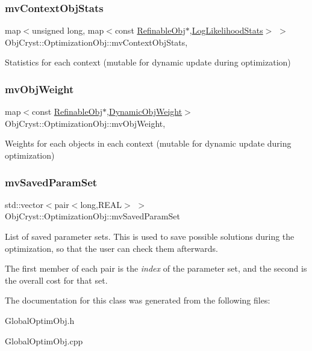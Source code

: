 \subsubsection{\texorpdfstring{mvContextObjStats}{mvContextObjStats}}
{\footnotesize\ttfamily map$<$unsigned long, map$<$const \mbox{\hyperlink{class_obj_cryst_1_1_refinable_obj}{Refinable\+Obj}}$\ast$,\mbox{\hyperlink{struct_obj_cryst_1_1_optimization_obj_1_1_log_likelihood_stats}{Log\+Likelihood\+Stats}}$>$ $>$ Obj\+Cryst\+::\+Optimization\+Obj\+::mv\+Context\+Obj\+Stats\hspace{0.3cm}{\ttfamily [mutable]}, {\ttfamily [protected]}}

Statistics for each context (mutable for dynamic update during optimization) \mbox{\label{class_obj_cryst_1_1_optimization_obj_a4b1120b0a6fc24c82c273152722f672c}} 
\subsubsection{\texorpdfstring{mvObjWeight}{mvObjWeight}}
{\footnotesize\ttfamily map$<$const \mbox{\hyperlink{class_obj_cryst_1_1_refinable_obj}{Refinable\+Obj}}$\ast$,\mbox{\hyperlink{struct_obj_cryst_1_1_optimization_obj_1_1_dynamic_obj_weight}{Dynamic\+Obj\+Weight}}$>$ Obj\+Cryst\+::\+Optimization\+Obj\+::mv\+Obj\+Weight\hspace{0.3cm}{\ttfamily [mutable]}, {\ttfamily [protected]}}

Weights for each objects in each context (mutable for dynamic update during optimization) \mbox{\label{class_obj_cryst_1_1_optimization_obj_a9063bb2fa6a6f0938295be2ffe2bfe84}} 
\subsubsection{\texorpdfstring{mvSavedParamSet}{mvSavedParamSet}}
{\footnotesize\ttfamily std\+::vector$<$pair$<$long,R\+E\+AL$>$ $>$ Obj\+Cryst\+::\+Optimization\+Obj\+::mv\+Saved\+Param\+Set\hspace{0.3cm}{\ttfamily [protected]}}

List of saved parameter sets. This is used to save possible solutions during the optimization, so that the user can check them afterwards.

The first member of each pair is the {\itshape index} of the parameter set, and the second is the overall cost for that set. 

The documentation for this class was generated from the following files\+:\begin{DoxyCompactItemize}
\item 
Global\+Optim\+Obj.\+h\item 
Global\+Optim\+Obj.\+cpp\end{DoxyCompactItemize}
